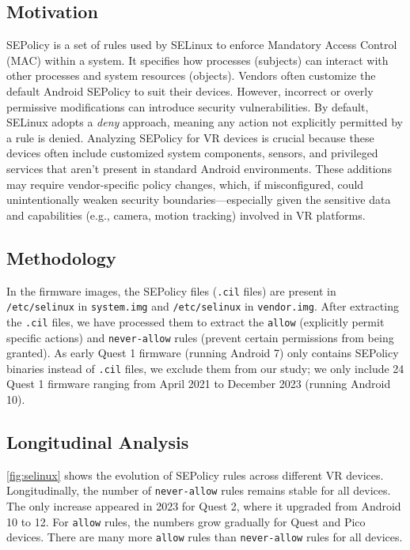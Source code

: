 \documentclass[sigconf]{acmart}
\newcommand{\cc}[1]{\mbox{\smaller[0.5]\texttt{#1}}}
\begin{document}
\subsection{Motivation}
SEPolicy is a set of rules used by SELinux to enforce Mandatory Access Control (MAC) within a system. It specifies how processes (subjects) can interact with other processes and system resources (objects). Vendors often customize the default Android SEPolicy to suit their devices. However, incorrect or overly permissive modifications can introduce security vulnerabilities. By default, SELinux adopts a {\it deny} approach, meaning any action not explicitly permitted by a rule is denied.
Analyzing SEPolicy for VR devices is crucial because these devices often include customized system components, sensors, and privileged services that aren't present in standard Android environments. These additions may require vendor-specific policy changes, which, if misconfigured, could unintentionally weaken security boundaries—especially given the sensitive data and capabilities (e.g., camera, motion tracking) involved in VR platforms.

\subsection{Methodology}
In the firmware images, the SEPolicy files (\cc{.cil} files) are present in \cc{/etc/selinux} in \cc{system.img} and \cc{/etc/selinux} in \cc{vendor.img}. 
After extracting the \cc{.cil} files,
we have processed them to extract the \cc{allow}  (explicitly permit specific actions) and \cc{never-allow} rules (prevent certain permissions from being granted).
As early Quest 1 firmware (running Android 7) only contains SEPolicy binaries instead of \cc{.cil} files, we exclude them from our study; we only include 24 Quest 1 firmware ranging from April 2021 to December 2023 (running Android 10). 

\subsection{Longitudinal Analysis}
\autoref{fig:selinux} shows the evolution of SEPolicy rules across different VR devices.
Longitudinally,
the number of  \cc{never-allow} rules remains stable for all devices.
The only increase appeared in 2023 for Quest 2, where
it upgraded from Android 10 to 12.
For \cc{allow} rules,
the numbers grow gradually for Quest and Pico devices.
There are many more  \cc{allow} rules than  \cc{never-allow} rules for all devices.
\end{document}
